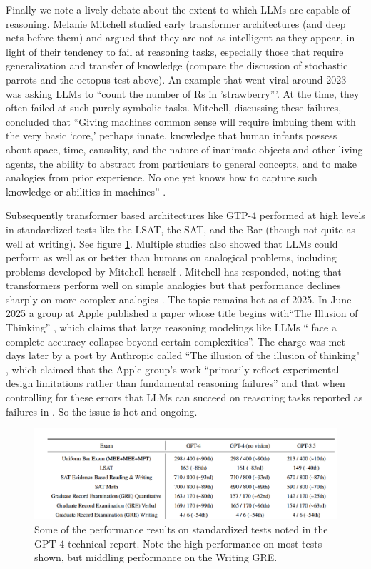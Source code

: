 Finally we note a lively debate about the extent to which LLMs are capable of
reasoning. Melanie Mitchell studied early transformer architectures (and deep
nets before them) and argued that they are not as intelligent as they appear,
in light of their tendency to fail at reasoning tasks, especially those that
require generalization and transfer of knowledge (compare the discussion of
stochastic parrots and the octopus test above).  An example that went viral
around 2023 was asking LLMs to  ``count the number of Rs in 'strawberry'''.  At
the time, they often failed at such purely symbolic tasks.  Mitchell,
discussing these failures, concluded that ``Giving machines common sense will
require imbuing them with the very basic `core,' perhaps innate, knowledge that
human infants possess about space, time, causality, and the nature of inanimate
objects and other living agents, the ability to abstract from particulars to
general concepts, and to make analogies from prior experience. No one yet knows
how to capture such knowledge or abilities in machines'' \cite{mitchell2021ai}. 

Subsequently transformer based architectures like GTP-4 performed at high
levels in standardized tests like the LSAT, the SAT, and the Bar (though not
quite as well at writing). See figure \ref{llmStandardExams}. Multiple studies
also showed that LLMs could perform as well as or better than humans on
analogical problems, including problems developed by Mitchell herself
\cite{webb2023emergent}.  Mitchell has responded, noting  that transformers
perform well on simple analogies but that performance declines sharply on  more
complex analogies \cite{lewis2025evaluating}. The topic remains hot as of 2025.
In June 2025 a group at Apple published a paper whose title begins with``The
Illusion of Thinking'' \cite{shojaee2025illusion}, which claims that large
reasoning modelings like LLMs `` face a complete accuracy collapse beyond
certain complexities''. The charge was met days later by a post by Anthropic
called ``The illusion of the illusion of thinking" \cite{opus2025illusion},
which claimed that the Apple group's work ``primarily reflect experimental
design limitations rather than fundamental reasoning failures'' and that when
controlling for these errors that LLMs can succeed on reasoning tasks reported
as failures in \cite{shojaee2025illusion}. So the issue is hot and ongoing.

\begin{figure}[ht]
\centering
\includegraphics[scale=.8]{./images/llmStandardizedExams.png}
\caption[From \cite{achiam2023gpt}.]{Some of the performance results on
standardized tests noted in the GPT-4 technical report.  Note the high
performance on most tests shown, but middling performance on the Writing GRE.
}
\label{llmStandardExams}
\end{figure}

